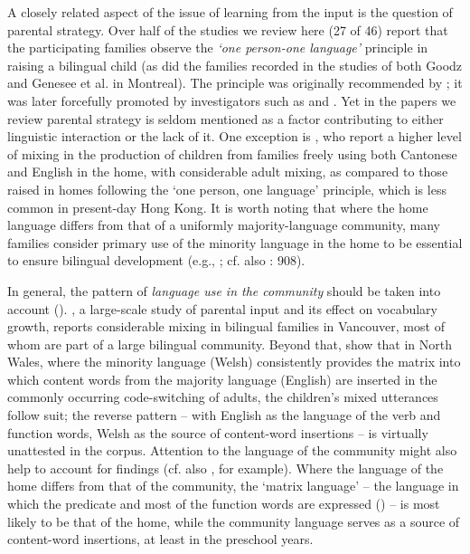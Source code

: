 \documentclass[output=paper]{langscibook}
\begin{document}
A closely related aspect of the issue of learning from the input is the question of parental strategy. Over half of the studies we review here (27 of 46) report that the participating families observe the \textit{‘one person-one language’} principle in raising a bilingual child (as did the families recorded in the studies of both Goodz and Genesee et al. in Montreal). The principle was originally recommended by \citet{Ronjat1913}; it was later forcefully promoted by investigators such as \citet{Dopke1992} and \citet{Dehouwer1995,Dehouwer2005}. Yet in the papers we review parental strategy is seldom mentioned as a factor contributing to either linguistic interaction or the lack of it.  One exception is \citet{YipMatthews2016}, who report a higher level of mixing in the production of children from families freely using both Cantonese and English in the home, with considerable adult mixing, as compared to those raised in homes following the ‘one person, one language’ principle, which is less common in present-day Hong Kong. It is worth noting that where the home language differs from that of a uniformly majority-language community, many families consider primary use of the minority language in the home to be essential to ensure bilingual development (e.g., \citealt{DeucharQuay2000,Vihman1985,Vihman1998}; cf. also \citealt{Gawlitzek-MaiwaldTracy1996}: 908).

In general, the pattern of \textit{language use in the community} should be taken into account (\citealt{PhillipsDeuchar2021}). \citet{Byers-Heinlein2013}, a large-scale study of parental input and its effect on vocabulary growth, reports considerable mixing in bilingual families in Vancouver, most of whom are part of a large bilingual community. Beyond that, \citet{PhillipsDeuchar2021} show that in North Wales, where the minority language (Welsh) consistently provides the matrix into which content words from the majority language (English) are inserted in the commonly occurring code-switching of adults, the children’s mixed utterances follow suit; the reverse pattern – with English as the language of the verb and function words, Welsh as the source of content-word insertions – is virtually unattested in the corpus. Attention to the language of the community might also help to account for  findings (cf. also \citealt{Lanza1997,Lanza_language_1997-1,Vihman1998}, for example). Where the language of the home differs from that of the community, the ‘matrix language’ – the language in which the predicate and most of the function words are expressed (\citealt{Myers-Scotton1993duelling}) – is most likely to be that of the home, while the community language serves as a source of content-word insertions, at least in the preschool years.
\end{document}
